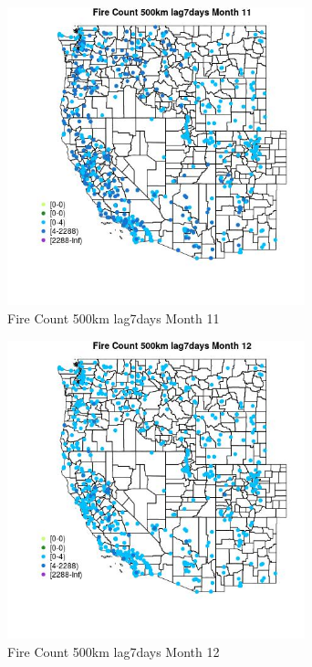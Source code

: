 \begin{figure} 
\centering  
\includegraphics[width=0.77\textwidth]{Code_Outputs/Report_ML_input_PM25_Step4_part_e_de_duplicated_aves_compiled_2019-05-21wNAs_MapObsMo11Fire_Count_500km_lag7days.jpg} 
\caption{\label{fig:Report_ML_input_PM25_Step4_part_e_de_duplicated_aves_compiled_2019-05-21wNAsMapObsMo11Fire_Count_500km_lag7days}Fire Count 500km lag7days Month 11} 
\end{figure} 
 

\begin{figure} 
\centering  
\includegraphics[width=0.77\textwidth]{Code_Outputs/Report_ML_input_PM25_Step4_part_e_de_duplicated_aves_compiled_2019-05-21wNAs_MapObsMo12Fire_Count_500km_lag7days.jpg} 
\caption{\label{fig:Report_ML_input_PM25_Step4_part_e_de_duplicated_aves_compiled_2019-05-21wNAsMapObsMo12Fire_Count_500km_lag7days}Fire Count 500km lag7days Month 12} 
\end{figure} 
 

